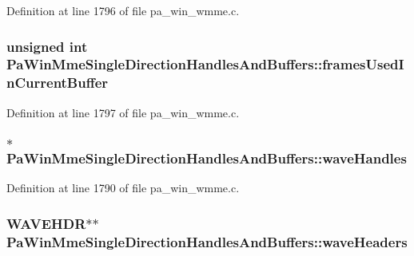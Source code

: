 Definition at line 1796 of file pa\+\_\+win\+\_\+wmme.\+c.

\subsubsection[{\texorpdfstring{frames\+Used\+In\+Current\+Buffer}{framesUsedInCurrentBuffer}}]{\setlength{\rightskip}{0pt plus 5cm}unsigned {\bf int} Pa\+Win\+Mme\+Single\+Direction\+Handles\+And\+Buffers\+::frames\+Used\+In\+Current\+Buffer}\hypertarget{struct_pa_win_mme_single_direction_handles_and_buffers_a67c47bbd9a948174ea0fecbe6a9939fa}{}\label{struct_pa_win_mme_single_direction_handles_and_buffers_a67c47bbd9a948174ea0fecbe6a9939fa}


Definition at line 1797 of file pa\+\_\+win\+\_\+wmme.\+c.

\subsubsection[{\texorpdfstring{wave\+Handles}{waveHandles}}]{$\ast$ Pa\+Win\+Mme\+Single\+Direction\+Handles\+And\+Buffers\+::wave\+Handles}\hypertarget{struct_pa_win_mme_single_direction_handles_and_buffers_a4fe7db0c9d532611932970f65aab44e9}{}\label{struct_pa_win_mme_single_direction_handles_and_buffers_a4fe7db0c9d532611932970f65aab44e9}


Definition at line 1790 of file pa\+\_\+win\+\_\+wmme.\+c.

\subsubsection[{\texorpdfstring{wave\+Headers}{waveHeaders}}]{\setlength{\rightskip}{0pt plus 5cm}W\+A\+V\+E\+H\+DR$\ast$$\ast$ Pa\+Win\+Mme\+Single\+Direction\+Handles\+And\+Buffers\+::wave\+Headers}\hypertarget{struct_pa_win_mme_single_direction_handles_and_buffers_a8df074ef0acecf9d5561398f4cfcd791}{}\label{struct_pa_win_mme_single_direction_handles_and_buffers_a8df074ef0acecf9d5561398f4cfcd791}


